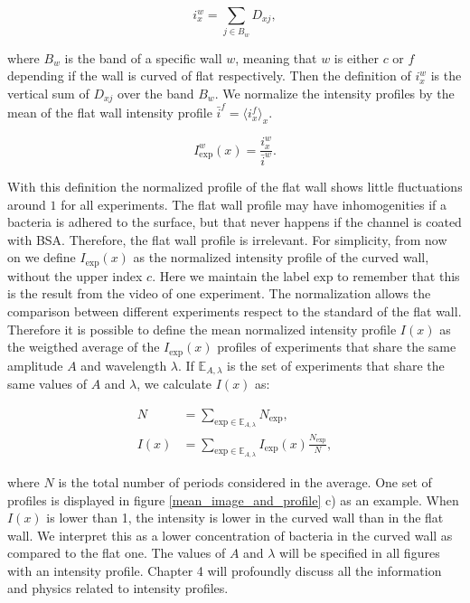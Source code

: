 \begin{equation}
	i_x^w = \sum_{j \in B_w} D_{xj},
\end{equation}

where $B_w$ is the band of a specific wall $w$, meaning that $w$ is either $c$ or $f$ depending if the wall is curved of flat respectively. Then the definition of $i_x^w$ is the vertical sum of $D_{xj}$ over the band $B_w$. We normalize the intensity profiles by the mean of the flat wall intensity profile $\bar{i}^f = \langle  i_x^f\rangle_x $. 

\begin{equation}  \label{eq:Intensity profile on experiment}
	I_{\text{exp}}^w(x) = \frac{i_x^w}{\bar{i}^w}.
\end{equation}

With this definition the normalized profile of the flat wall shows little fluctuations around $1$ for all experiments. The flat wall profile may have inhomogenities if a bacteria is adhered to the surface, but that never happens if the channel is coated with BSA. Therefore, the flat wall profile is irrelevant. For simplicity, from now on we define $I_{\text{exp}}(x)$ as the normalized intensity profile of the curved wall, without the upper index $c$. Here we maintain the label $\text{exp}$ to remember that this is the result from the video of one experiment. The normalization allows the comparison between different experiments respect to the standard of the flat wall. Therefore it is possible to define the mean normalized intensity profile $I(x)$ as the weigthed average of the $I_{\text{exp}}(x)$ profiles of experiments that share the same amplitude $A$ and wavelength $\lambda$. If $\mathbb{E}_{A,\lambda}$ is the set of experiments that share the same values of $A$ and $\lambda$, we calculate $I(x)$ as:
 
 \begin{align}
    N &= \sum_{\text{exp} \in \mathbb{E}_{A,\lambda}} N_{\text{exp}},     \\
    I(x) &= \sum_{\text{exp} \in \mathbb{E}_{A,\lambda}} I_{\text{exp}}(x) \frac{N_{\text{exp}}}{N},
    \label{eq:Intensity profile}
 \end{align}
 
where $N$ is the total number of periods considered in the average. One set of profiles is displayed in figure \ref{mean_image_and_profile} c) as an example. When $I(x)$ is lower than 1, the intensity is lower in the curved wall than in the flat wall. We interpret this as a lower concentration of bacteria in the curved wall as compared to the flat one. The values of $A$ and $\lambda$ will be specified in all figures with an intensity profile. Chapter 4 will profoundly discuss all the information and physics related to intensity profiles.


